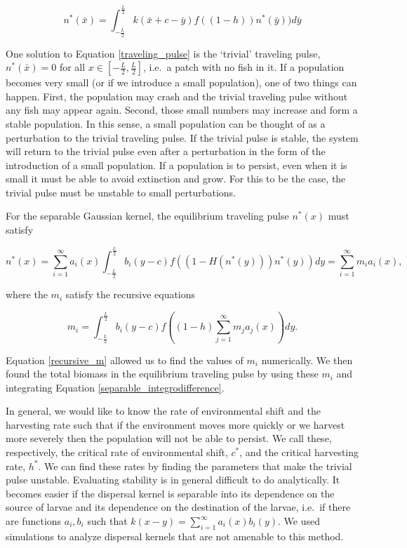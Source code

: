 \documentclass[]{article}
\begin{document}
\begin{equation}
n^*(\bar{x})=\int^{\frac{L}{2}}_{-\frac{L}{2}}k(\bar{x}+c-\bar{y})f((1-h))n^*(\bar{y}))d
\bar{y} \label{traveling_pulse}
\end{equation}

One solution to Equation \ref{traveling_pulse} is the `trivial' traveling pulse, $n^*(\bar{x}) = 0$ for all $x \in \left[-\frac{L}
{2}, \frac{L}{2}\right]$, i.e.~a patch with no fish in it. If a population becomes very small (or if we introduce a small 
population), one of two things can happen. First, the population may crash and the trivial traveling pulse 
without any fish may appear again. Second, those small numbers may increase and form a stable population. 
In this sense, a small population can be thought of as a perturbation to the trivial traveling pulse. If the trivial 
pulse is stable, the system will return to the trivial pulse even after a perturbation in the form of the introduction 
of a small population. If a population is to persist, even when it is small it must be able to avoid extinction and 
grow. For this to be the case, the trivial pulse must be unstable to small perturbations.  

For the separable Gaussian kernel, the equilibrium traveling pulse $n^*(x)$ must satisfy

\begin{equation}
n^*(x)=\sum^\infty_{i=1}
a_i(x)\int^{\frac{L}{2}}_{-\frac{L}{2}}b_i(y-c)f((1-H(n^*(y)))n^*(y))dy=\sum^\infty_{i=1}m_ia_i(x), \label{separable_integrodifference}
\end{equation}

\noindent where the $m_i$ satisfy the recursive equations

\begin{equation}
m_i=\int^{\frac{L}{2}}_{-\frac{L}{2}}b_i(y-c)f\left((1-h)\sum^\infty_{j=1}m_ja_j(x)\right)
dy. \label{recursive_m}
\end{equation}

\noindent Equation \ref{recursive_m} allowed us to find the values of $m_i$ numerically. We then found the total biomass in the 
equilibrium traveling pulse by using these $m_i$ and integrating Equation \ref{separable_integrodifference}.

In general, we would like to know the rate of environmental shift and the harvesting rate such that if the 
environment moves more quickly or we harvest more severely then the population will not be able to persist. 
We call these, respectively, the critical rate of environmental shift, $c^*$, and the critical harvesting rate, $h^*$. 
We can find these rates by finding the parameters that make the trivial pulse unstable. Evaluating stability is in 
general difficult to do analytically. It becomes easier if the dispersal kernel is separable into its dependence on the 
source of larvae and its dependence on the destination of the larvae,
i.e.~if there are functions $a_i, b_i$ such that $k(x- y) = \sum^\infty_{i=1} a_i(x)b_i(y)$. We used 
simulations to analyze dispersal kernels that are not amenable to this method.
\end{document}
